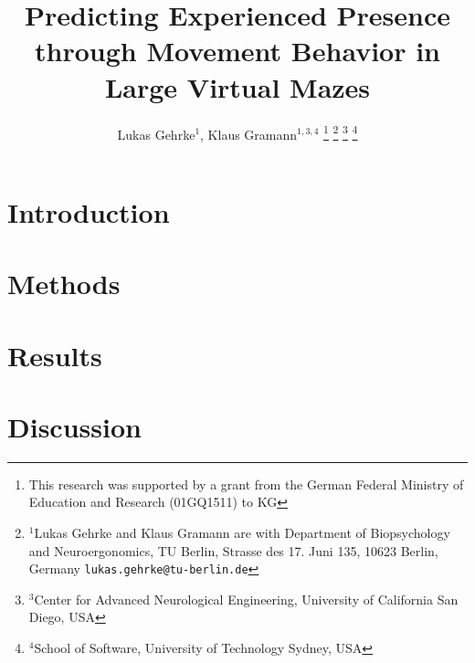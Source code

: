 \documentclass[letterpaper, 10 pt, conference]{ieeeconf}  %
\title{\LARGE \bf Predicting Experienced Presence through Movement Behavior in Large Virtual Mazes}
\author{Lukas Gehrke$^{1}$, Klaus Gramann$^{1,3,4}$%
\thanks{This research was supported by a grant from the German Federal Ministry of Education and Research (01GQ1511) to KG}%
\thanks{$^{1}$Lukas Gehrke and Klaus Gramann are with Department of Biopsychology and Neuroergonomics, TU Berlin, Strasse des 17. Juni 135, 10623 Berlin, Germany
        {\tt\small lukas.gehrke@tu-berlin.de}}%
\thanks{$^{3}$Center for Advanced Neurological Engineering, University of California San Diego, USA}
\thanks{$^{4}$School of Software, University of Technology Sydney, USA}
}
\begin{document}
\maketitle
\thispagestyle{empty}
\pagestyle{empty}

\begin{abstract}

\end{abstract}

\section{Introduction}



\section{Methods}





\section{Results}




\section{Discussion}



\addtolength{\textheight}{-12cm}   %



\end{document}
